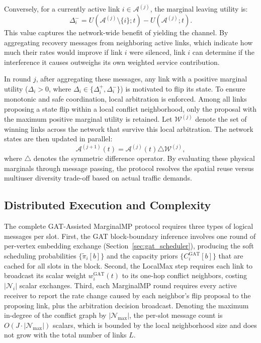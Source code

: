 \documentclass[letterpaper,journal]{IEEEtran}
\begin{document}
Conversely, for a currently active link $i \in \mathcal{A}^{(j)}$, the marginal leaving utility is:
\begin{equation}
	\Delta_i^- = U(\mathcal{A}^{(j)} \setminus \{i\}; t) - U(\mathcal{A}^{(j)}; t).
\end{equation}
This value captures the network-wide benefit of yielding the channel. By aggregating recovery messages from neighboring active links, which indicate how much their rates would improve if link $i$ were silenced, link $i$ can determine if the interference it causes outweighs its own weighted service contribution. 

In round $j$, after aggregating these messages, any link with a positive marginal utility ($\Delta_i > 0$, where $\Delta_i \in \{\Delta_i^+, \Delta_i^-\}$) is motivated to flip its state. To ensure monotonic and safe coordination, local arbitration is enforced. Among all links proposing a state flip within a local conflict neighborhood, only the proposal with the maximum positive marginal utility is retained. Let $\mathcal{W}^{(j)}$ denote the set of winning links across the network that survive this local arbitration. The network states are then updated in parallel:
\begin{equation}
	\mathcal{A}^{(j+1)}(t) = \mathcal{A}^{(j)}(t) \triangle \mathcal{W}^{(j)},
\end{equation}
where $\triangle$ denotes the symmetric difference operator. By evaluating these physical marginals through message passing, the protocol resolves the spatial reuse versus multiuser diversity trade-off based on actual traffic demands.

\subsection{Distributed Execution and Complexity}
\label{ssec:overhead}

The complete GAT-Assisted MarginalMP protocol requires three types of logical messages per slot. First, the GAT block-boundary inference involves one round of per-vertex embedding exchange (Section~\ref{sec:gat_scheduler}), producing the soft scheduling probabilities $\{\tilde{\pi}_i[b]\}$ and the capacity priors $\{C_i^{\mathrm{GAT}}[b]\}$ that are cached for all slots in the block. Second, the LocalMax step requires each link to broadcast its scalar weight $w_i^{\mathrm{GAT}}(t)$ to its one-hop conflict neighbors, costing $|\mathcal{N}_i|$ scalar exchanges. Third, each MarginalMP round requires every active receiver to report the rate change caused by each neighbor's flip proposal to the proposing link, plus the arbitration decision broadcast. Denoting the maximum in-degree of the conflict graph by $|\mathcal{N}_{\max}|$, the per-slot message count is $O(J\cdot|\mathcal{N}_{\max}|)$ scalars, which is bounded by the local neighborhood size and does not grow with the total number of links $L$.
\end{document}
